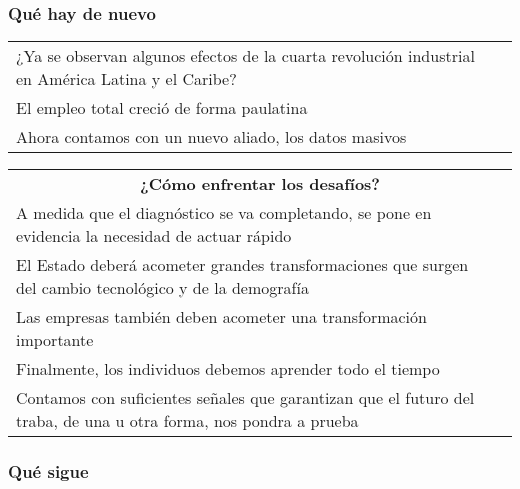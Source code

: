 \subsubsection{Qué hay de nuevo}

\begingroup
\setlength{\tabcolsep}{12pt} %
\renewcommand{\arraystretch}{1.5} %
\begin{tabular}{p{4cm}|p{11cm}}
¿Ya se observan algunos efectos de la cuarta revolución industrial en América Latina y el Caribe?&\\
El empleo total creció de forma paulatina&\\
Ahora contamos con un nuevo aliado, los datos masivos&\\
\end{tabular}
\endgroup


\begingroup
\setlength{\tabcolsep}{12pt} %
\renewcommand{\arraystretch}{1.5} %
\begin{tabular}{p{4cm}|p{11cm}}
\multicolumn{2}{c}{\large \bf ¿Cómo enfrentar los desafíos?}\\
A medida que el diagnóstico se va completando, se pone en evidencia la necesidad de actuar rápido&\\
El Estado deberá acometer grandes transformaciones que surgen del cambio tecnológico y de la demografía&\\
Las empresas también deben acometer una transformación importante&\\
Finalmente, los individuos debemos aprender todo el tiempo&\\
Contamos con suficientes señales que garantizan que el futuro del traba, de una u otra forma, nos pondra a prueba&\\
\end{tabular}
\endgroup

\subsubsection{Qué sigue}